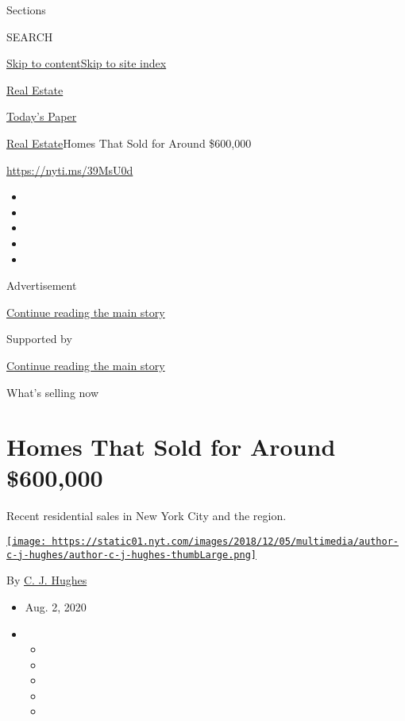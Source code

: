 Sections

SEARCH

\protect\hyperlink{site-content}{Skip to
content}\protect\hyperlink{site-index}{Skip to site index}

\href{https://www.nytimes.com/section/realestate}{Real Estate}

\href{https://myaccount.nytimes.com/auth/login?response_type=cookie\&client_id=vi}{}

\href{https://www.nytimes.com/section/todayspaper}{Today's Paper}

\href{/section/realestate}{Real Estate}\textbar{}Homes That Sold for
Around \$600,000

\url{https://nyti.ms/39MsU0d}

\begin{itemize}
\item
\item
\item
\item
\item
\end{itemize}

Advertisement

\protect\hyperlink{after-top}{Continue reading the main story}

Supported by

\protect\hyperlink{after-sponsor}{Continue reading the main story}

What's selling now

\hypertarget{homes-that-sold-for-around-600000}{%
\section{Homes That Sold for Around
\$600,000}\label{homes-that-sold-for-around-600000}}

Recent residential sales in New York City and the region.

\href{https://www.nytimes.com/by/c-j-hughes}{\texttt{[image: https://static01.nyt.com/images/2018/12/05/multimedia/author-c-j-hughes/author-c-j-hughes-thumbLarge.png]}}

By \href{https://www.nytimes.com/by/c-j-hughes}{C. J. Hughes}

\begin{itemize}
\item
  Aug. 2, 2020
\item
  \begin{itemize}
  \item
  \item
  \item
  \item
  \item
  \end{itemize}
\end{itemize}

